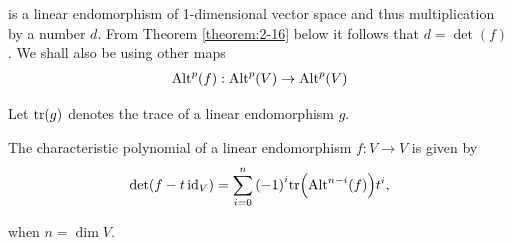 is a linear endomorphism of 1-dimensional vector space and thus multiplication by a number $d$. From Theorem 
\ref{theorem:2-16} below it follows that $d = \det(f)$. We shall also be using other maps 
\begin{align*}
  \operatorname{Alt}^p(f): \operatorname{Alt}^p(V)\to\operatorname{Alt}^p(V)
\end{align*}

Let $\operatorname{tr}(g)$ denotes the trace of a linear endomorphism $g$.


\begin{theorem}\label{theorem:2-16}
  The characteristic polynomial of a linear endomorphism $f:V\to V$ is given by
  \begin{align*}
    \det(f-t\operatorname{id}_V)=\sum\limits_{i=0}^n{(-1)}^i\mathrm{tr}\Big(\mathrm{Alt}^{n-i}(f)\Big)t^i,
  \end{align*}

  when $n = \dim V$.
\end{theorem}

